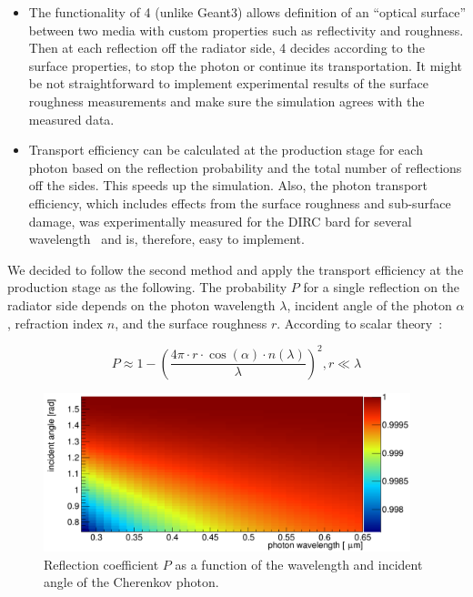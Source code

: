 \begin{itemize}
\item The functionality of {\geant}4 (unlike Geant3) allows definition of an ``optical surface'' between two media with custom properties such as reflectivity and roughness. Then at each reflection off the radiator side, {\geant}4 decides according to the surface properties, to stop the photon or continue its transportation. It might be not straightforward to implement experimental results of the surface roughness measurements and make sure the simulation agrees with the measured data.
\item Transport efficiency can be calculated at the production stage for each photon based on the reflection probability and the total number of reflections off the sides. This speeds up the simulation. Also, the photon transport efficiency, which includes effects from the surface roughness and sub-surface damage, was experimentally measured for the \babar DIRC bard for several wavelength~\cite{roughness} and is, therefore, easy to implement.
\end{itemize}

We decided to follow the second method and apply the transport efficiency at the production stage as the following. The probability $P$ for a single reflection on the radiator side depends on the photon wavelength $\lambda$, incident angle of the photon $\alpha$, refraction index $n$, and the surface roughness $r$. According to scalar theory~\cite{scalar}:

\begin{equation}
P \approx  1 - \left( \frac{4\pi \cdot r \cdot \cos(\alpha) \cdot n(\lambda)}{\lambda} \right)^{2}, r \ll \lambda
\end{equation}

\begin{figure}[!h]
\centering
\includegraphics[width=0.95\textwidth]{pics/psurf.png}
\caption{\label{pic:sur}
Reflection coefficient $P$ as a function of the wavelength and incident angle of the Cherenkov photon.
}
\end{figure}

